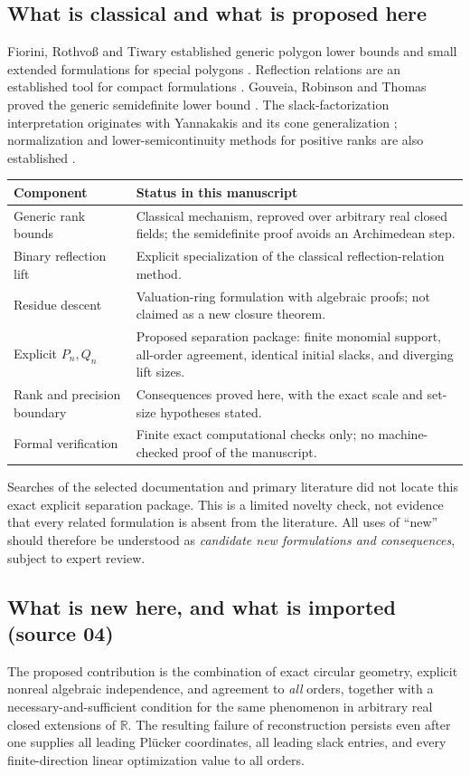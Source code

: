 \documentclass[11pt,a4paper]{article}
\numberwithin{equation}{section}
\theoremstyle{plain}
\newcommand{\R}{\mathbb R}
\begin{document}
\subsection{What is classical and what is proposed here}
Fiorini, Rothvo\ss{} and Tiwary established generic polygon lower bounds and
small extended formulations for special polygons \cite{ic:frt}. Reflection
relations are an established tool for compact formulations \cite{ic:kp}.
Gouveia, Robinson and Thomas proved the generic semidefinite lower bound
\cite{ic:grt}. The slack-factorization interpretation originates with
Yannakakis and its cone generalization \cite{ic:yannakakis,ic:gpt}; normalization
and lower-semicontinuity methods for positive ranks are also established
\cite{ic:psdrank}.

\begin{center}
\begin{tabular}{@{}p{}p{}@{}}
\toprule
Component & Status in this manuscript \\
\midrule
Generic rank bounds & Classical mechanism, reproved over arbitrary real
closed fields; the semidefinite proof avoids an Archimedean step.\\
Binary reflection lift & Explicit specialization of the classical
reflection-relation method.\\
Residue descent & Valuation-ring formulation with algebraic proofs;
not claimed as a new closure theorem.\\
Explicit $P_n,Q_n$ & Proposed separation package: finite monomial support,
all-order agreement, identical initial slacks, and diverging lift sizes.\\
Rank and precision boundary & Consequences proved here, with the exact
scale and set-size hypotheses stated.\\
Formal verification & Finite exact computational checks only; no
machine-checked proof of the manuscript.\\
\bottomrule
\end{tabular}
\end{center}

Searches of the selected documentation and primary literature did not locate
this exact explicit separation package. This is a limited novelty check,
not evidence that every related formulation is absent from the literature.
All uses of ``new'' should therefore be understood as \emph{candidate new
formulations and consequences}, subject to expert review.

\subsection{What is new here, and what is imported (source 04)}
The proposed contribution is the combination of exact circular geometry,
explicit nonreal algebraic independence, and agreement to \emph{all}
orders, together with a necessary-and-sufficient condition for the same
phenomenon in arbitrary real closed extensions of $\R$. The resulting
failure of reconstruction persists even after one supplies all leading
Pl\"ucker coordinates, all leading slack entries, and every finite-direction
linear optimization value to all orders.
\end{document}
